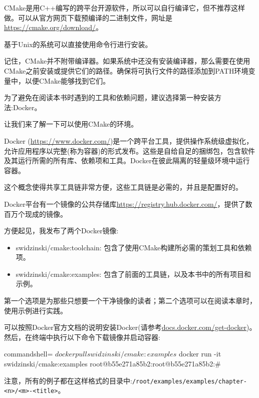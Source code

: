 
CMake是用C++编写的跨平台开源软件，所以可以自行编译它，但不推荐这样做。可以从官方网页下载预编译的二进制文件，网址是\url{https://cmake.org/download/}。

基于Unix的系统可以直接使用命令行进行安装。

\begin{tcolorbox}[colback=blue!5!white,colframe=blue!75!black,title=Note]
记住，CMake并不附带编译器。如果系统中还没有安装编译器，那么需要在使用CMake之前安装或提供它们的路径。确保将可执行文件的路径添加到PATH环境变量中，以便CMake能够找到它们。

为了避免在阅读本书时遇到的工具和依赖问题，建议选择第一种安装方法:Docker。
\end{tcolorbox}

让我们来了解一下可以使用CMake的环境。


Docker (\url{https://www.docker.com/})是一个跨平台工具，提供操作系统级虚拟化，允许应用程序以完整(称为容器)的形式发布。这些是自给自足的捆绑包，包含软件及其运行所需的所有库、依赖项和工具。Docker在彼此隔离的轻量级环境中运行容器。

这个概念使得共享工具链非常方便，这些工具链是必需的，并且是配置好的。

Docker平台有一个镜像的公共存储库\url{https://registry.hub.docker.com/}，提供了数百万个现成的镜像。

方便起见，我发布了两个Docker镜像:

\begin{itemize}
\item 
swidzinski/cmake:toolchain: 包含了使用CMake构建所必需的策划工具和依赖项。

\item 
swidzinski/cmake:examples: 包含了前面的工具链，以及本书中的所有项目和示例。
\end{itemize}

第一个选项是为那些只想要一个干净镜像的读者；第二个选项可以在阅读本章时，使用示例进行实践。

可以按照Docker官方文档的说明安装Docker(请参考\url{docs.docker.com/get-docker})。然后，在终端中执行以下命令下载镜像并启动容器:

\begin{tcblisting}{commandshell={}}
$ docker pull swidzinski/cmake:examples
$ docker run -it swidzinski/cmake:examples
root@b55e271a85b2:root@b55e271a85b2:#
\end{tcblisting}

注意，所有的例子都在这样格式的目录中:\texttt{/root/examples/examples/chapter-<n>/<m>-<title>}。

